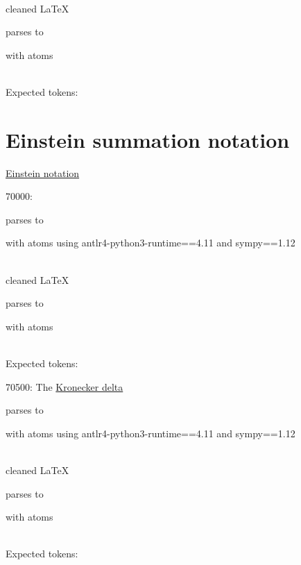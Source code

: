 \documentclass{article}
\begin{document}
\ \\
cleaned \LaTeX

parses to

with atoms


\ \\
Expected tokens:



\hrulefill


\section{Einstein summation notation}


\href{https://en.wikipedia.org/wiki/Einstein_notation}{Einstein notation}

70000:

parses to

with atoms
using antlr4-python3-runtime==4.11 and sympy==1.12

\ \\
cleaned \LaTeX

parses to

with atoms


\ \\
Expected tokens:



\hrulefill

70500:
The \href{https://en.wikipedia.org/wiki/Kronecker_delta}{Kronecker delta}

parses to

with atoms
using antlr4-python3-runtime==4.11 and sympy==1.12

\ \\
cleaned \LaTeX

parses to

with atoms


\ \\
Expected tokens:

\end{document}
